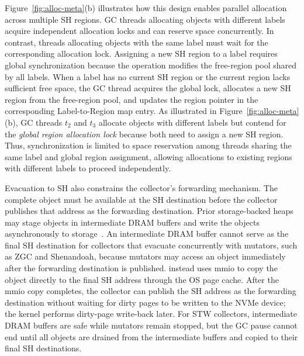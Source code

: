 Figure~\ref{fig:alloc-meta}(b) illustrates how this design enables parallel allocation across multiple SH regions.
GC threads allocating objects with different labels acquire independent allocation locks and can reserve space concurrently.
In contrast, threads allocating objects with the same label must wait for the corresponding allocation lock.
Assigning a new SH region to a label requires global synchronization because the operation modifies the free-region pool shared by all labels.
When a label has no current SH region or the current region lacks sufficient free space, the GC thread acquires the global lock, allocates a new SH region from the free-region pool, and updates the region pointer in the corresponding Label-to-Region map entry.
As illustrated in Figure~\ref{fig:alloc-meta}(b), GC threads $t_2$ and $t_3$ allocate objects with different labels but contend for the \emph{global region allocation lock} because both need to assign a new SH region.
Thus, synchronization is limited to space reservation among threads sharing the same label and global region assignment, allowing allocations to existing regions with different labels to proceed independently.

Evacuation to SH also constrains the collector's forwarding mechanism.
The complete object must be available at the SH destination before the collector publishes that address as the forwarding destination.
Prior storage-backed heaps may stage objects in intermediate DRAM buffers and write the objects asynchronously to storage~\cite{bond:melt,teraheap}.
An intermediate DRAM buffer cannot serve as the final SH destination for collectors that evacuate concurrently with mutators, such as ZGC and Shenandoah, because mutators may access an object immediately after the forwarding destination is published.
\chipperName{} instead uses mmio to copy the object directly to the final SH address through the OS page cache.
After the mmio copy completes, the collector can publish the SH address as the forwarding destination without waiting for dirty pages to be written to the NVMe device; the kernel performs dirty-page write-back later.
For STW collectors, intermediate DRAM buffers are safe while mutators remain stopped, but the GC pause cannot end until all objects are drained from the intermediate buffers and copied to their final SH destinations.

